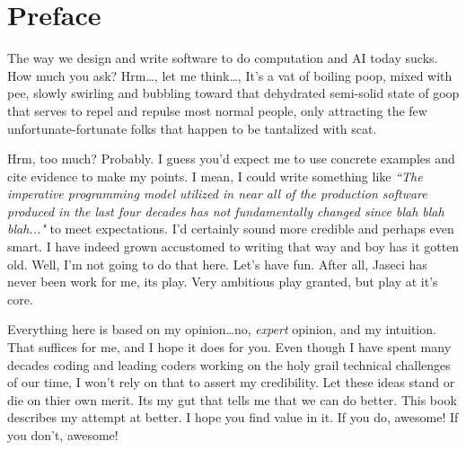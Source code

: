 \chapter*{Preface}

The way we design and write software to do computation and AI today sucks. How much you ask? Hrm\dots, let me think\dots, It's a vat of boiling poop, mixed with pee, slowly swirling and bubbling toward that dehydrated semi-solid state of goop that serves to repel and repulse most normal people, only attracting the few unfortunate-fortunate folks that happen to be tantalized with \gls{scat}.
\par
Hrm, too much? Probably. I guess you'd expect me to use concrete examples and cite evidence to make my points. I mean, I could write something like \textit{``The imperative programming model utilized in near all of the production software produced in the last four decades has not fundamentally changed since blah blah blah..."} to meet expectations. I'd certainly sound more credible and perhaps even smart. I have indeed grown accustomed to writing that way and boy has it gotten old. Well, I'm not going to do that here. Let's have fun. After all, Jaseci has never been work for me, its play. Very ambitious play granted, but play at it's core.
\par
Everything here is based on my opinion\dots no, \emph{expert} opinion, and my intuition. That suffices for me, and I hope it does for you. Even though I have spent many decades coding and leading coders working on the holy grail technical challenges of our time, I won't rely on that to assert my credibility. Let these ideas stand or die on thier own merit. Its my gut that tells me that we can do better. This book describes my attempt at better. I hope you find value in it. If you do, awesome! If you don't, awesome!
